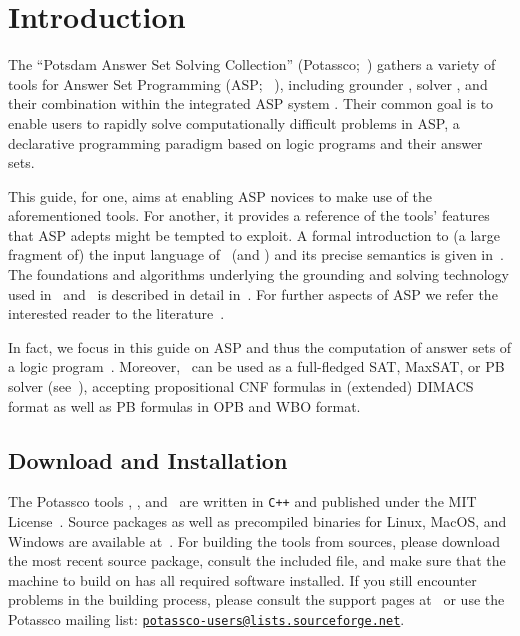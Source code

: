 \section{Introduction}\label{sec:introduction}

The ``Potsdam Answer Set Solving Collection'' (Potassco;~\cite{gekakaosscsc11a,gekakasc12a,potassco})
gathers a variety of tools for Answer Set Programming (ASP;~%
\cite{ankolisc05a,baral02a,breitr11a,gelfond08a,gelkah14a,gelleo02a,lifschitz02a,martru99a,niemela99a}),
including grounder \gringo, solver \clasp, and their combination within the integrated ASP system \clingo.
Their common goal is to enable users
to rapidly solve computationally difficult problems in ASP,
a declarative programming paradigm based on
logic programs and their answer sets.

This guide, for one, aims at enabling ASP novices to make use of the aforementioned tools.
For another, it provides a reference of the tools' features that ASP adepts might be tempted to exploit.
%
A formal introduction to (a large fragment of) the input language of \gringo\ (and \clingo) and its precise semantics is given in~\cite{gehakalisc15a}.
The foundations and algorithms underlying the grounding and solving technology used in \gringo\ and \clasp\ is described in detail in~\cite{gekakasc12a}.
%
For further aspects of ASP we refer the interested reader to the literature~\cite{baral02a,gelkah14a}.

In fact,
we focus in this guide on ASP and thus the computation of answer sets of a logic program~\cite{gellif88b}.
Moreover, \clasp\ can be used as a full-fledged SAT, MaxSAT, or PB solver (see~\cite{SATHandbook}),
accepting propositional CNF formulas in (extended) DIMACS format as well as PB formulas in OPB and WBO format.

\subsection{Download and Installation}\label{sec:install}

The Potassco tools \gringo, \clasp, and \clingo\
are written in \texttt{C++} and published under the MIT License~\cite{MITlicense}.
Source packages as well as precompiled binaries for Linux, MacOS, and Windows
are available at~\cite{potassco}.
For building the tools from sources,
please download the most recent source package,
consult the included  file,
and make sure that the machine to build on has all required software installed.
If you still encounter problems in the building process,
please consult the support pages at~\cite{potassco}
or use the Potassco mailing list:
\href{mailto:potassco-users@lists.sourceforge.net}{\texttt{potassco-users@lists.sourceforge.net}}.

